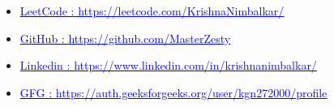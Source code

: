 \documentclass[10pt,a4paper,ragged2e]{altacv}
\begin{document}
\smallskip
\begin{itemize}
\item {\href{https://leetcode.com/KrishnaNimbalkar/}{\textcolor{blue}{LeetCode : \underline{https://leetcode.com/KrishnaNimbalkar/ }}}}
\smallskip
\item {\href{https://github.com/MasterZesty}{\textcolor{blue}{GitHub : \underline{https://github.com/MasterZesty}}}}
\smallskip
\item {\href{https://www.linkedin.com/in/krishnanimbalkar/}{\textcolor{blue}{Linkedin : \underline{https://www.linkedin.com/in/krishnanimbalkar/}}}}
\item {\href{https://auth.geeksforgeeks.org/user/kgn272000/profile}{\textcolor{blue}{GFG : \underline{https://auth.geeksforgeeks.org/user/kgn272000/profile}}}}
\end{itemize}

\clearpage


\nocite{*}



\end{document}
